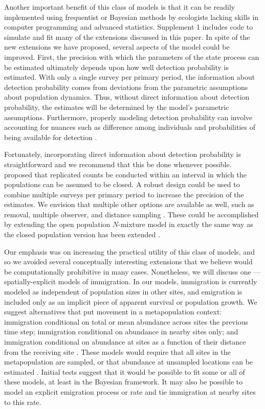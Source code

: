 \documentclass[12pt,english]{article}
\begin{document}
\begin{spacing}{1.9}
\begin{flushleft}
Another important benefit of this class of models is that it can be
readily implemented using frequentist or Bayesian methods by
ecologists lacking skills in computer programming and advanced
statistics. Supplement 1 includes code to
simulate and fit many of the extensions discussed in this paper.
In spite of the new extensions we have proposed, several aspects of
the model could be improved. First, the precision with which the
parameters of the state process can be estimated ultimately depends
upon how well detection probability is estimated. With
only a single survey per primary period, the information about
detection probability comes from deviations from the parametric
assumptions about population dynamics. Thus, without direct information
about detection probability, the estimates will be determined by the
model's parametric assumptions. Furthermore, properly modeling detection
probability can involve accounting for nuances such as difference
among individuals and probabilities of being available for detection
\citep{nichols_etal:2009}.

Fortunately, incorporating direct information about detection probability 
is straightforward and we recommend that this be done whenever
possible. \citet{dail_madsen:2011} proposed that
replicated counts be conducted within an interval in which the populations can 
be assumed to be closed. A robust design \citep{pollock:1982} could be 
used to combine multiple surveys per
primary period to increase the precision of the estimates. We envision
that multiple other options are available as well, such as removal,
multiple observer, and distance sampling \citep{williams_etal:2002}. These could be
accomplished by extending the open population $N$-mixture model
in exactly the same way as the closed population version has been
extended \citep[e.g.,][]{royle_etal:2004}.

Our emphasis was on increasing the practical utility of this
class of models, and so we avoided several conceptually interesting
extensions that we believe would be computationally prohibitive in many
cases. Nonetheless, we will discuss one --- spatially-explicit models of
immigration. 
In our models, immigration is currently modeled as independent of
population sizes in other sites, and emigration is included only
as an implicit piece of apparent survival or population growth. 
We suggest alternatives that put movement in a metapopulation
context: immigration conditional on total or mean %
abundance across sites the previous time step; immigration
conditional on abundance in nearby sites only; and immigration
conditional on abundance at sites as a function of their distance
from the receiving site \citep{hastings:1991,hanski:1998}. These models would
require that all sites in the metapopulation are sampled, or that abundance at 
unsampled locations can be estimated \citep{lele_etal:1998}. 
Initial tests suggest that it would be
possible to fit some or all of these models, at least in the
Bayesian framework. It may also be possible to model an explicit emigration
process or rate and tie immigration at nearby sites to this rate.


\end{flushleft}
\end{spacing}
\end{document}
